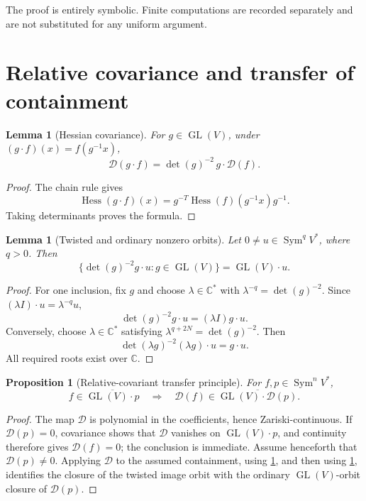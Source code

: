 \documentclass[11pt]{article}
\newtheorem{proposition}[theorem]{Proposition}
\newtheorem{lemma}[theorem]{Lemma}
\theoremstyle{remark}
\DeclareMathOperator{\Hess}{Hess}
\DeclareMathOperator{\Sym}{Sym}
\DeclareMathOperator{\GL}{GL}
\newcommand{\C}{\mathbb C}
\newcommand{\Dcal}{\mathcal D}
\begin{document}
The proof is entirely symbolic.  Finite computations are recorded separately and are not substituted for any uniform argument.

\section{Relative covariance and transfer of containment}\label{sec:transfer}

\begin{lemma}[Hessian covariance]\label{lem:covariance}
For $g\in\GL(V)$, under $(g\cdot f)(x)=f(g^{-1}x)$,
\[
 \Dcal(g\cdot f)=\det(g)^{-2}\,g\cdot\Dcal(f).
\]
\end{lemma}
\begin{proof}
The chain rule gives
\[
 \Hess(g\cdot f)(x)=g^{-T}\Hess(f)(g^{-1}x)g^{-1}.
\]
Taking determinants proves the formula.
\end{proof}

\begin{lemma}[Twisted and ordinary nonzero orbits]\label{lem:twisted}
Let $0\neq u\in\Sym^qV^*$, where $q>0$.  Then
\[
 \{\det(g)^{-2}g\cdot u:g\in\GL(V)\}=\GL(V)\cdot u.
\]
\end{lemma}
\begin{proof}
For one inclusion, fix $g$ and choose $\lambda\in\C^*$ with $\lambda^{-q}=\det(g)^{-2}$.  Since $(\lambda I)\cdot u=\lambda^{-q}u$,
\[
 \det(g)^{-2}g\cdot u=(\lambda I)g\cdot u.
\]
Conversely, choose $\lambda\in\C^*$ satisfying $\lambda^{q+2N}=\det(g)^{-2}$.  Then
\[
 \det(\lambda g)^{-2}(\lambda g)\cdot u=g\cdot u.
\]
All required roots exist over $\C$.
\end{proof}

\begin{proposition}[Relative-covariant transfer principle]\label{prop:transfer}
For $f,p\in\Sym^nV^*$,
\[
 f\in\overline{\GL(V)\cdot p}
 \quad\Longrightarrow\quad
 \Dcal(f)\in\overline{\GL(V)\cdot\Dcal(p)}.
\]
\end{proposition}
\begin{proof}
The map $\Dcal$ is polynomial in the coefficients, hence Zariski-continuous.  If $\Dcal(p)=0$, covariance shows that $\Dcal$ vanishes on $\GL(V)\cdot p$, and continuity therefore gives $\Dcal(f)=0$; the conclusion is immediate.  Assume henceforth that $\Dcal(p)\neq0$.  Applying $\Dcal$ to the assumed containment, using \cref{lem:covariance}, and then using \cref{lem:twisted}, identifies the closure of the twisted image orbit with the ordinary $\GL(V)$-orbit closure of $\Dcal(p)$.
\end{proof}
\end{document}
